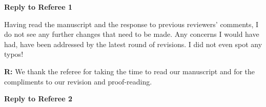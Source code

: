 \documentclass[12pt]{letter}
\newenvironment{refquote}{\bigskip \begin{it}}{\end{it}\smallskip}
\begin{document}










\clearpage

{\Large \bf Reply to Referee 1}

	\begin{refquote}
	Having read the manuscript and the response to previous reviewers’ comments, I do not see any further changes that need to be made. Any concerns I would have had, have been addressed by the latest round of revisions. I did not even spot any typos!
	\end{refquote}


	\textbf{R:} We thank the referee for taking the time to read our manuscript and for the compliments to our revision and proof-reading.


\clearpage

{\Large \bf Reply to Referee 2} 
\end{document}
